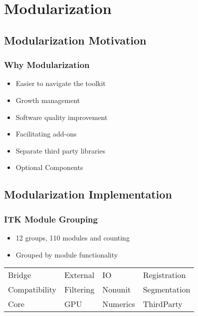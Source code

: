 \section{Modularization}

\subsection{Modularization Motivation}

\begin{frame}
\frametitle{Why Modularization}
\begin{itemize}
\item Easier to navigate the toolkit
\pause
\item Growth management
\pause
\item Software quality improvement
\pause
\item Facilitating add-ons
\pause
\item Separate third party libraries
\pause
\item Optional Components
\end{itemize}
\end{frame}

\subsection{Modularization Implementation}

\begin{frame}
\frametitle{ITK Module Grouping}
\begin{itemize}
\item  12 groups, 110 modules and counting
\pause
\item  Grouped by module functionality
\pause
\end{itemize}
\vskip14pt
\begin{tabular}{llll}
Bridge     &    \alert{External}   & IO        & Registration \\
Compatibility  & Filtering  & Nonunit   & Segmentation \\
Core           & GPU        & Numerics  & ThirdParty \\
\end{tabular}
\end{frame}



